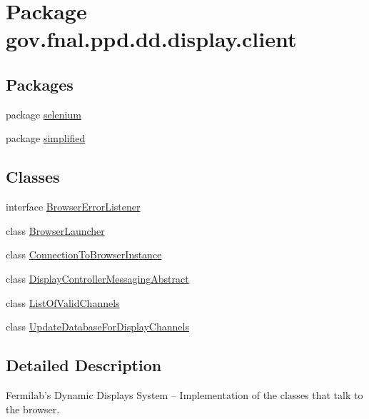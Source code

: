\hypertarget{namespacegov_1_1fnal_1_1ppd_1_1dd_1_1display_1_1client}{\section{Package gov.\-fnal.\-ppd.\-dd.\-display.\-client}
\label{namespacegov_1_1fnal_1_1ppd_1_1dd_1_1display_1_1client}
}
\subsection*{Packages}
\begin{DoxyCompactItemize}
\item 
package \hyperlink{namespacegov_1_1fnal_1_1ppd_1_1dd_1_1display_1_1client_1_1selenium}{selenium}
\item 
package \hyperlink{namespacegov_1_1fnal_1_1ppd_1_1dd_1_1display_1_1client_1_1simplified}{simplified}
\end{DoxyCompactItemize}
\subsection*{Classes}
\begin{DoxyCompactItemize}
\item 
interface \hyperlink{interfacegov_1_1fnal_1_1ppd_1_1dd_1_1display_1_1client_1_1BrowserErrorListener}{Browser\-Error\-Listener}
\item 
class \hyperlink{classgov_1_1fnal_1_1ppd_1_1dd_1_1display_1_1client_1_1BrowserLauncher}{Browser\-Launcher}
\item 
class \hyperlink{classgov_1_1fnal_1_1ppd_1_1dd_1_1display_1_1client_1_1ConnectionToBrowserInstance}{Connection\-To\-Browser\-Instance}
\item 
class \hyperlink{classgov_1_1fnal_1_1ppd_1_1dd_1_1display_1_1client_1_1DisplayControllerMessagingAbstract}{Display\-Controller\-Messaging\-Abstract}
\item 
class \hyperlink{classgov_1_1fnal_1_1ppd_1_1dd_1_1display_1_1client_1_1ListOfValidChannels}{List\-Of\-Valid\-Channels}
\item 
class \hyperlink{classgov_1_1fnal_1_1ppd_1_1dd_1_1display_1_1client_1_1UpdateDatabaseForDisplayChannels}{Update\-Database\-For\-Display\-Channels}
\end{DoxyCompactItemize}


\subsection{Detailed Description}
Fermilab's Dynamic Displays System -- Implementation of the classes that talk to the browser.